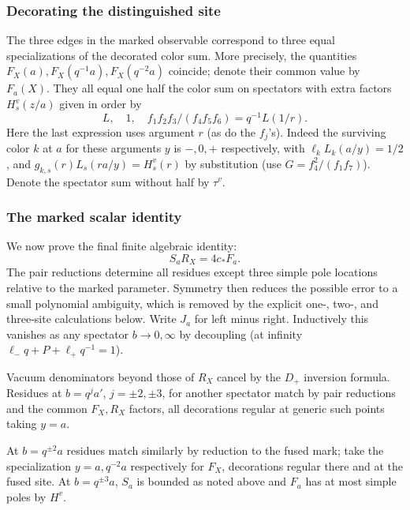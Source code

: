 \subsubsection{Decorating the distinguished site}

The three edges in the marked observable correspond to three equal
specializations of the decorated color sum. More precisely, the quantities
\(F_X(a),F_X(q^{-1}a),F_X(q^{-2}a)\) coincide; denote their common value by
$F_a(X)$. They all equal one half the color sum on spectators with extra factors \(H_s^v(z/a)\) given in order by
\[
                 L,\quad 1,\quad f_1 f_2 f_3/(f_4 f_5 f_6)=q^{-1}L(1/r).
\]
Here the last expression uses argument \(r\) (as do the \(f_j\)'s). Indeed the surviving color \(k\) at \(a\) for these arguments \(y\) is \(-,0,+\) respectively, with \(\ell_k L_k(a/y)=1/2\), and \(g_{k,s}(r)L_s(ra/y)=H_s^v(r)\) by substitution (use \(G=f_4^2/(f_1f_7)\)). Denote the spectator sum without half by \(\tau^v\).

\subsubsection{The marked scalar identity}

We now prove the final finite algebraic identity:
\begin{equation}\label{a:marked-scalar}
                               S_a R_X=4c_* F_a .
\end{equation}
The pair reductions determine all residues except three simple pole
locations relative to the marked parameter. Symmetry then reduces the
possible error to a small polynomial ambiguity, which is removed by the
explicit one-, two-, and three-site calculations below.
Write \(J_a\) for left minus right. Inductively this vanishes as any spectator \(b\to0,\infty\) by decoupling (at infinity \(\ell_- q+P+\ell_+q^{-1}=1\)).

Vacuum denominators beyond those of \(R_X\) cancel by the \(D_+\) inversion formula. Residues at \(b=q^j a'\), \(j=\pm2,\pm3\), for another spectator match by pair reductions and the common \(F_X,R_X\) factors, all decorations regular at generic such points taking \(y=a\).

At \(b=q^{\pm2}a\) residues match similarly by reduction to the fused mark; take the specialization \(y=a,q^{-2}a\) respectively for \(F_X\), decorations regular there and at the fused site. At \(b=q^{\pm3}a\), \(S_a\) is bounded as noted above and \(F_a\) has at most simple poles by \(H^v\).

